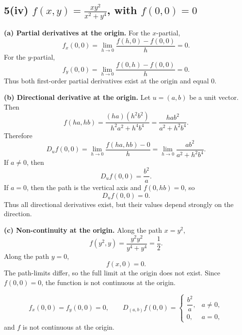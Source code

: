 \documentclass[11pt]{article}
\begin{document}
\subsection{5(iv) \(\displaystyle f(x,y)=\frac{xy^2}{x^2+y^4}\), with \(f(0,0)=0\)}

\textbf{(a) Partial derivatives at the origin.} For the \(x\)-partial,
\[
f_x(0,0)=\lim_{h\to0}\frac{f(h,0)-f(0,0)}{h}=0.
\]
For the \(y\)-partial,
\[
f_y(0,0)=\lim_{h\to0}\frac{f(0,h)-f(0,0)}{h}=0.
\]
Thus both first-order partial derivatives exist at the origin and equal \(0\).

\textbf{(b) Directional derivative at the origin.} Let \(u=(a,b)\) be a unit vector. Then
\[
f(ha,hb)=\frac{(ha)(h^2b^2)}{h^2a^2+h^4b^4}
=\frac{h a b^2}{a^2+h^2b^4}.
\]
Therefore
\[
D_u f(0,0)=\lim_{h\to0}\frac{f(ha,hb)-0}{h}
=\lim_{h\to0}\frac{a b^2}{a^2+h^2b^4}.
\]
If \(a\neq0\), then
\[
D_u f(0,0)=\frac{b^2}{a}.
\]
If \(a=0\), then the path is the vertical axis and \(f(0,hb)=0\), so
\[
D_u f(0,0)=0.
\]
Thus all directional derivatives exist, but their values depend strongly on the direction.

\textbf{(c) Non-continuity at the origin.} Along the path \(x=y^2\),
\[
f(y^2,y)=\frac{y^2y^2}{y^4+y^4}=\frac12.
\]
Along the path \(y=0\),
\[
f(x,0)=0.
\]
The path-limits differ, so the full limit at the origin does not exist. Since \(f(0,0)=0\), the function is not continuous at the origin.

\begin{center}
\end{center}

\begin{answerbox}
\[
\boxed{f_x(0,0)=f_y(0,0)=0,\qquad
D_{(a,b)}f(0,0)=
\begin{cases}
\dfrac{b^2}{a},&a\neq0,\\[6pt]
0,&a=0,
\end{cases}}
\]
and \(f\) is not continuous at the origin.
\end{answerbox}
\end{document}
